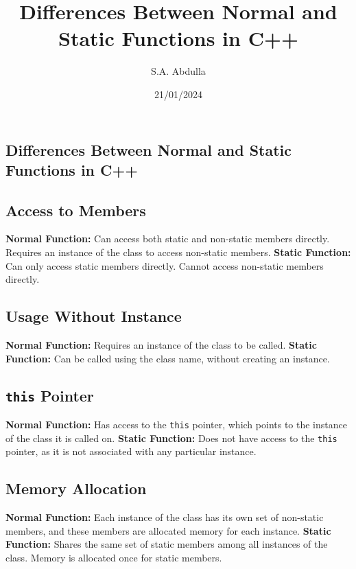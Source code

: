 \documentclass{article}
\title{Differences Between Normal and Static Functions in C++}
\author{S.A. Abdulla}
\date{21/01/2024}
\begin{document}
\maketitle
\newpage
\begin{center}
    \section*{Differences Between Normal and Static Functions in C++}
\end{center}
\subsection*{Access to Members}
\textbf{Normal Function:} Can access both static and non-static members directly. Requires an instance of the class to access non-static members.
\textbf{Static Function:} Can only access static members directly. Cannot access non-static members directly.
\subsection*{Usage Without Instance}
\textbf{Normal Function:} Requires an instance of the class to be called.
\textbf{Static Function:} Can be called using the class name, without creating an instance.
\subsection*{\texttt{this} Pointer}
\textbf{Normal Function:} Has access to the \texttt{this} pointer, which points to the instance of the class it is called on.
\textbf{Static Function:} Does not have access to the \texttt{this} pointer, as it is not associated with any particular instance.
\subsection*{Memory Allocation}
\textbf{Normal Function:} Each instance of the class has its own set of non-static members, and these members are allocated memory for each instance.
\textbf{Static Function:} Shares the same set of static members among all instances of the class. Memory is allocated once for static members.
\end{document}
